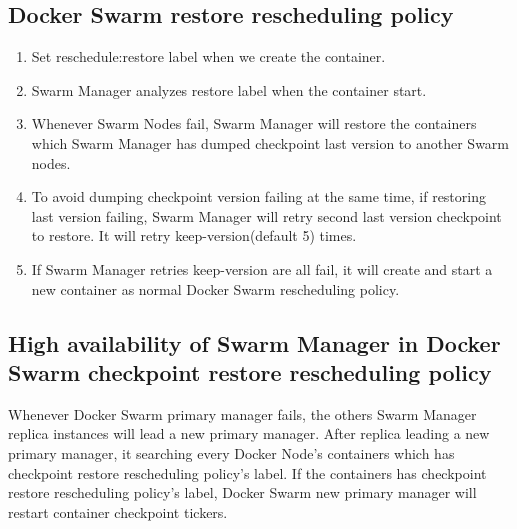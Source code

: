\subsection{Docker Swarm restore rescheduling policy}
\begin{enumerate}[Step 1.]
	\item Set reschedule:restore label when we create the container.
	\item Swarm Manager analyzes restore label when the container start.
    \item Whenever Swarm Nodes fail, Swarm Manager will restore the containers which Swarm Manager has dumped checkpoint last version to another Swarm nodes.
    \item To avoid dumping checkpoint version failing at the same time, if restoring last version failing, Swarm Manager will retry second last version checkpoint to restore. It will retry keep-version(default 5) times.
    \item If Swarm Manager retries keep-version are all fail, it will create and start a new container as normal Docker Swarm rescheduling policy.
\end{enumerate}

\subsection{High availability of Swarm Manager in Docker Swarm checkpoint restore rescheduling policy}
Whenever Docker Swarm primary manager fails, the others Swarm Manager replica instances will lead a new primary manager. After replica leading a new primary manager, it searching every Docker Node's containers which has checkpoint restore rescheduling policy's label. If the containers has checkpoint restore rescheduling policy's label, Docker Swarm new primary manager will restart container checkpoint tickers.